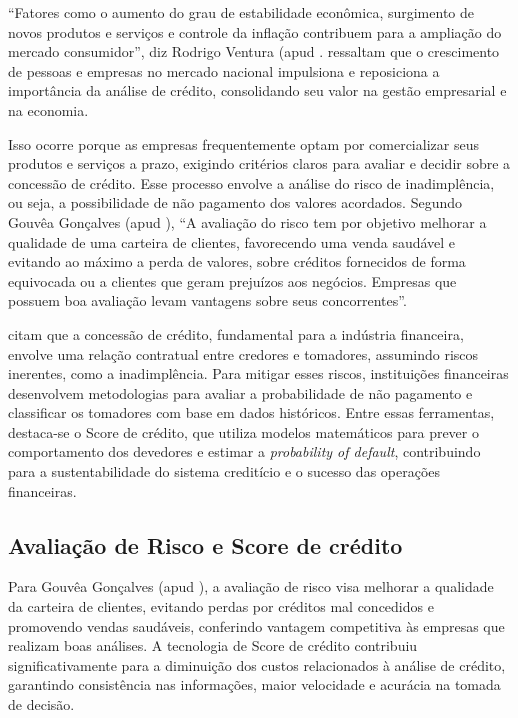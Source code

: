 \documentclass[12pt,a4paper]{article}
\begin{document}
“Fatores como o aumento do grau de estabilidade econômica, surgimento de novos produtos e serviços e controle da inflação contribuem para a ampliação do mercado consumidor”, diz Rodrigo Ventura (apud \cite{fuhr2022}. \cite{fuhr2022} ressaltam que o crescimento de pessoas e empresas no mercado nacional impulsiona e reposiciona a importância da análise de crédito, consolidando seu valor na gestão empresarial e na economia. 

Isso ocorre porque as empresas frequentemente optam por comercializar seus produtos e serviços a prazo, exigindo critérios claros para avaliar e decidir sobre a concessão de crédito. Esse processo envolve a análise do risco de inadimplência, ou seja, a possibilidade de não pagamento dos valores acordados. Segundo Gouvêa Gonçalves (apud \cite{fuhr2022}), “A avaliação do risco tem por objetivo melhorar a qualidade de uma carteira de clientes, favorecendo uma venda saudável e evitando ao máximo a perda de valores, sobre créditos fornecidos de forma equivocada ou a clientes que geram prejuízos aos negócios. Empresas que possuem boa avaliação levam vantagens sobre seus concorrentes”. 

\cite{montevechi2022} citam que a concessão de crédito, fundamental para a indústria financeira, envolve uma relação contratual entre credores e tomadores, assumindo riscos inerentes, como a inadimplência. Para mitigar esses riscos, instituições financeiras desenvolvem metodologias para avaliar a probabilidade de não pagamento e classificar os tomadores com base em dados históricos. Entre essas ferramentas, destaca-se o Score de crédito, que utiliza modelos matemáticos para prever o comportamento dos devedores e estimar a \textit{probability of default}, contribuindo para a sustentabilidade do sistema creditício e o sucesso das operações financeiras.
\subsection{Avaliação de Risco e Score de crédito}

Para Gouvêa Gonçalves (apud \cite{fuhr2022}), a avaliação de risco visa melhorar a qualidade da carteira de clientes, evitando perdas por créditos mal concedidos e promovendo vendas saudáveis, conferindo vantagem competitiva às empresas que realizam boas análises. A tecnologia de Score de crédito contribuiu significativamente para a diminuição dos custos relacionados à análise de crédito, garantindo consistência nas informações, maior velocidade e acurácia na tomada de decisão.
\end{document}
